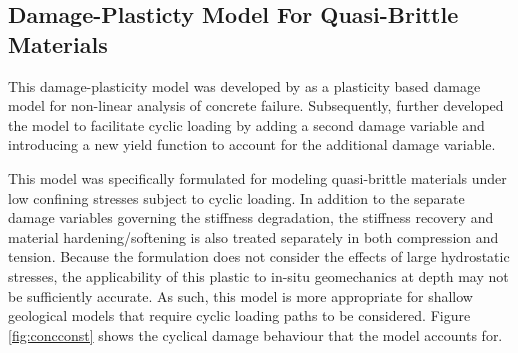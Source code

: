 \subsection{Damage-Plasticty Model For Quasi-Brittle Materials}

This damage-plasticity model was developed by \citet{lubliner_plastic-damage_1989} as a plasticity based damage model for non-linear analysis of concrete failure. Subsequently, \citet{lee_plastic-damage_1998} further developed the model to facilitate cyclic loading by adding a second damage variable and introducing a new yield function to account for the additional damage variable. 

This model was specifically formulated for modeling quasi-brittle materials under low confining stresses subject to cyclic loading. In addition to the separate damage variables governing the stiffness degradation, the stiffness recovery and material hardening/softening is also treated separately in both compression and tension. Because the formulation does not consider the effects of large hydrostatic stresses, the applicability of this plastic to in-situ geomechanics at depth may not be sufficiently accurate. As such, this model is more appropriate for shallow geological models that require cyclic loading paths to be considered. Figure \ref{fig:concconst} shows the cyclical damage behaviour that the model accounts for.

